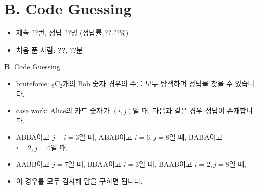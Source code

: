 \section{B. Code Guessing}

\begin{frame} %
    \begin{itemize}
        \item 제출 ??번, 정답 ??명 (정답률 ??.??\%)
        \item 처음 푼 사람: \textbf{??}, ??분
    \end{itemize}
\end{frame}

\begin{frame}{\textbf{B}. Code Guessing}
    \begin{itemize}
        \item bruteforce: ${}_9 \mathrm{C}_2$개의 Bob 숫자 경우의 수를 모두 탐색하며 정답을 찾을 수 있습니다.
        \item case work: Alice의 카드 숫자가 $(i,j)$일 때, 다음과 같은 경우 정답이 존재합니다.
        \item ABBA이고 $j-i=3$일 때, ABAB이고 $i=6, j=8$일 때, BABA이고 $i=2, j=4$일 때,
        \item AABB이고 $j=7$일 때, BBAA이고 $i=3$일 때, BAAB이고 $i=2, j=8$일 때,
        \item 이 경우를 모두 검사해 답을 구하면 됩니다.
    \end{itemize}
\end{frame}